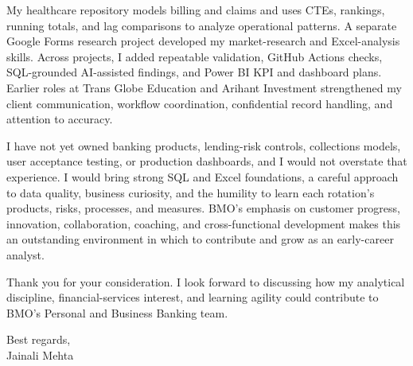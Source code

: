 \documentclass[letterpaper,11pt]{article}
\begin{document}
\bigbreak
My healthcare repository models billing and claims and uses CTEs, rankings, running totals, and lag comparisons to analyze operational patterns. A separate Google Forms research project developed my market-research and Excel-analysis skills. Across projects, I added repeatable validation, GitHub Actions checks, SQL-grounded AI-assisted findings, and Power BI KPI and dashboard plans. Earlier roles at Trans Globe Education and Arihant Investment strengthened my client communication, workflow coordination, confidential record handling, and attention to accuracy.

\bigbreak
I have not yet owned banking products, lending-risk controls, collections models, user acceptance testing, or production dashboards, and I would not overstate that experience. I would bring strong SQL and Excel foundations, a careful approach to data quality, business curiosity, and the humility to learn each rotation's products, risks, processes, and measures. BMO's emphasis on customer progress, innovation, collaboration, coaching, and cross-functional development makes this an outstanding environment in which to contribute and grow as an early-career analyst.

\bigbreak
Thank you for your consideration. I look forward to discussing how my analytical discipline, financial-services interest, and learning agility could contribute to BMO's Personal and Business Banking team.

\bigbreak
Best regards,\\
Jainali Mehta
\end{document}
